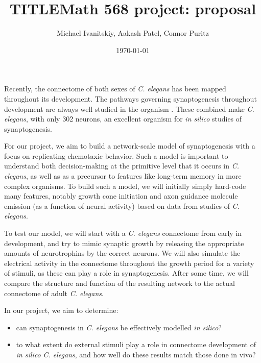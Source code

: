 \documentclass{article}
\title{TITLE}
\author{Michael Ivanitskiy, Aakash Patel, Connor Puritz}
\date{\today}
\title{Math 568 project: proposal}
\begin{document}
\maketitle\noindent

Recently, the connectome of both sexes of \emph{C. elegans} has been mapped throughout its development\cite{connectome-development}\cite{sexes-whole-connectome}\cite{sexual-dimorphism}. The pathways governing synaptogenesis throughout development are always well studied in the organism \cite{axon-guidance-genetics}. These combined make \emph{C. elegans}, with only 302 neurons, an excellent organism for \emph{in silico} studies of synaptogenesis.

For our project, we aim to build a network-scale model of synaptogenesis with a focus on replicating chemotaxic behavior. Such a model is important to understand both decision-making at the primitive level that it occurs in \emph{C. elegans}\cite{dynamic-encoding-chemotaxis}\cite{decision-connectome}, as well as as a precursor to features like long-term memory in more complex organisms. To build such a model, we will initially simply hard-code many features, notably growth cone initiation and axon guidance molecule emission (as a function of neural activity) based on data from studies of \emph{C. elegans}.

To test our model, we will start with a \emph{C. elegans} connectome from early in development, and try to mimic synaptic growth by releasing the appropriate amounts of neurotrophins by the correct neurons. We will also simulate the electrical activity in the connectome throughout the growth period for a variety of stimuli, as these can play a role in synaptogenesis. After some time, we will compare the structure and function of the resulting network to the actual connectome of adult \emph{C. elegans}.

In our project, we aim to determine:
\begin{itemize}
	\item can synaptogenesis in \emph{C. elegans} be effectively modelled \emph{in silico}?
	\item to what extent do external stimuli play a role in connectome development of \emph{in silico} \emph{C. elegans}, and how well do these results match those done in vivo?
\end{itemize}

{}

\end{document}
